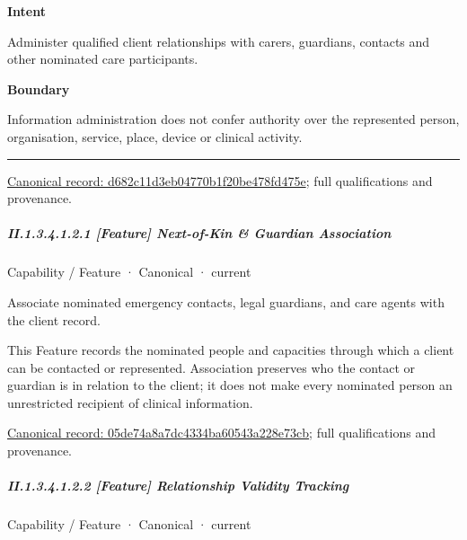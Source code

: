 \textbf{Intent}



Administer qualified client relationships with carers, guardians, contacts and other nominated care participants.



\textbf{Boundary}



Information administration does not confer authority over the represented person, organisation, service, place, device or clinical activity.



\medskip\hrule\medskip

{\footnotesize \href{../../../../continuum/strategy/capability/d682c11d3eb04770b1f20be478fd475e.md}{Canonical record: d682c11d3eb04770b1f20be478fd475e}; full qualifications and provenance.}\par
\subparagraph*{II.1.3.4.1.2.1 [Feature] Next-of-Kin \& Guardian Association}
\label{navigation:II.1.3.4.1.2.1}

\label{element:05de74a8a7dc4334ba60543a228e73cb}
{\small Capability / Feature · Canonical · current}\par

Associate nominated emergency contacts, legal guardians, and care agents with the client record.



This Feature records the nominated people and capacities through which a client can be contacted or represented. Association preserves who the contact or guardian is in relation to the client; it does not make every nominated person an unrestricted recipient of clinical information.


{\footnotesize \href{../../../../continuum/strategy/capability/feature/05de74a8a7dc4334ba60543a228e73cb.md}{Canonical record: 05de74a8a7dc4334ba60543a228e73cb}; full qualifications and provenance.}\par
\subparagraph*{II.1.3.4.1.2.2 [Feature] Relationship Validity Tracking}
\label{navigation:II.1.3.4.1.2.2}

\label{element:309603a8330545abb5db5f9889aa60d9}
{\small Capability / Feature · Canonical · current}\par

